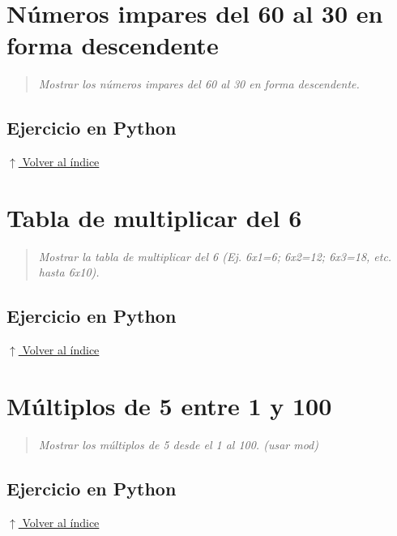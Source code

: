 \documentclass[12pt]{article}
\newcommand{\codigopython}[2]{%
}
\newcommand{\volverindice}{%
    \vspace{1em}%
    \begin{flushright}%
        \hyperlink{indice}{\small $\uparrow$ Volver al índice}%
    \end{flushright}%
}
\newcommand{\enunciado}[1]{%
    \begin{quote}
        \itshape #1
    \end{quote}
}
\begin{document}
\section{Números impares del 60 al 30 en forma descendente}

\enunciado{Mostrar los números impares del 60 al 30 en forma descendente.}

\subsection*{Ejercicio en Python}

\codigopython{16}{Números impares del 60 al 30 en forma descendente}

\volverindice
\newpage


\section{Tabla de multiplicar del 6}

\enunciado{Mostrar la tabla de multiplicar del 6 (Ej. 6x1=6; 6x2=12; 6x3=18, etc. hasta 6x10).}

\subsection*{Ejercicio en Python}

\codigopython{17}{Tabla de multiplicar del 6}

\volverindice
\newpage


\section{Múltiplos de 5 entre 1 y 100}

\enunciado{Mostrar los múltiplos de 5 desde el 1 al 100. (usar mod)}

\subsection*{Ejercicio en Python}

\codigopython{18}{Múltiplos de 5 entre 1 y 100}

\volverindice
\newpage

\end{document}
